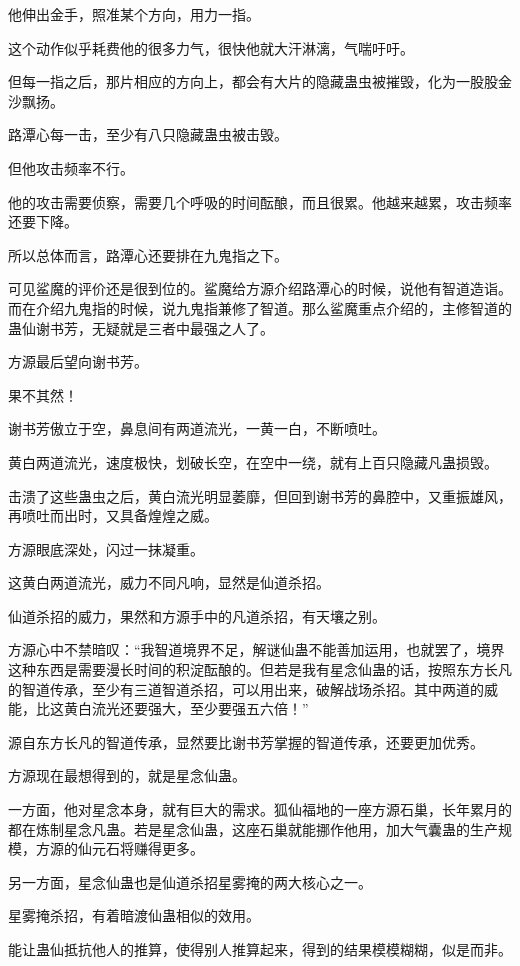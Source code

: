 \begin{this_body}
他伸出金手，照准某个方向，用力一指。

这个动作似乎耗费他的很多力气，很快他就大汗淋漓，气喘吁吁。

但每一指之后，那片相应的方向上，都会有大片的隐藏蛊虫被摧毁，化为一股股金沙飘扬。

路潭心每一击，至少有八只隐藏蛊虫被击毁。

但他攻击频率不行。

他的攻击需要侦察，需要几个呼吸的时间酝酿，而且很累。他越来越累，攻击频率还要下降。

所以总体而言，路潭心还要排在九鬼指之下。

可见鲨魔的评价还是很到位的。鲨魔给方源介绍路潭心的时候，说他有智道造诣。而在介绍九鬼指的时候，说九鬼指兼修了智道。那么鲨魔重点介绍的，主修智道的蛊仙谢书芳，无疑就是三者中最强之人了。

方源最后望向谢书芳。

果不其然！

谢书芳傲立于空，鼻息间有两道流光，一黄一白，不断喷吐。

黄白两道流光，速度极快，划破长空，在空中一绕，就有上百只隐藏凡蛊损毁。

击溃了这些蛊虫之后，黄白流光明显萎靡，但回到谢书芳的鼻腔中，又重振雄风，再喷吐而出时，又具备煌煌之威。

方源眼底深处，闪过一抹凝重。

这黄白两道流光，威力不同凡响，显然是仙道杀招。

仙道杀招的威力，果然和方源手中的凡道杀招，有天壤之别。

方源心中不禁暗叹：“我智道境界不足，解谜仙蛊不能善加运用，也就罢了，境界这种东西是需要漫长时间的积淀酝酿的。但若是我有星念仙蛊的话，按照东方长凡的智道传承，至少有三道智道杀招，可以用出来，破解战场杀招。其中两道的威能，比这黄白流光还要强大，至少要强五六倍！”

源自东方长凡的智道传承，显然要比谢书芳掌握的智道传承，还要更加优秀。

方源现在最想得到的，就是星念仙蛊。

一方面，他对星念本身，就有巨大的需求。狐仙福地的一座方源石巢，长年累月的都在炼制星念凡蛊。若是星念仙蛊，这座石巢就能挪作他用，加大气囊蛊的生产规模，方源的仙元石将赚得更多。

另一方面，星念仙蛊也是仙道杀招星雾掩的两大核心之一。

星雾掩杀招，有着暗渡仙蛊相似的效用。

能让蛊仙抵抗他人的推算，使得别人推算起来，得到的结果模模糊糊，似是而非。


\end{this_body}
